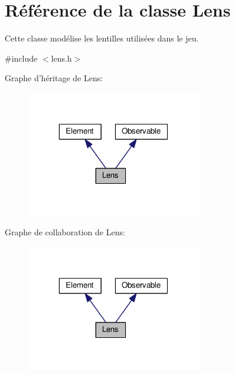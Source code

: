 \hypertarget{classLens}{\section{Référence de la classe Lens}
\label{classLens}
}


Cette classe modélise les lentilles utilisées dans le jeu.  




{\ttfamily \#include $<$lens.\+h$>$}



Graphe d'héritage de Lens\+:
\nopagebreak
\begin{figure}[H]
\begin{center}
\leavevmode
\includegraphics[width=217pt]{d4/def/classLens__inherit__graph}
\end{center}
\end{figure}


Graphe de collaboration de Lens\+:
\nopagebreak
\begin{figure}[H]
\begin{center}
\leavevmode
\includegraphics[width=217pt]{d8/df0/classLens__coll__graph}
\end{center}
\end{figure}
